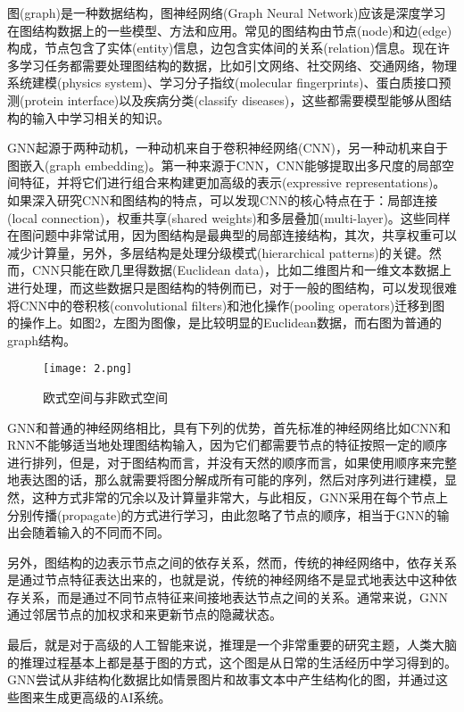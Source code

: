 \documentclass[a4paper,UTF8]{article}
\numberwithin{equation}{section}
\begin{document}
	图(graph)是一种数据结构，图神经网络(Graph Neural Network)应该是深度学习在图结构数据上的一些模型、方法和应用。常见的图结构由节点(node)和边(edge)构成，节点包含了实体(entity)信息，边包含实体间的关系(relation)信息。现在许多学习任务都需要处理图结构的数据，比如引文网络、社交网络、交通网络，物理系统建模(physics system)、学习分子指纹(molecular fingerprints)、蛋白质接口预测(protein interface)以及疾病分类(classify diseases)，这些都需要模型能够从图结构的输入中学习相关的知识。
	
	GNN起源于两种动机，一种动机来自于卷积神经网络(CNN)，另一种动机来自于图嵌入(graph embedding)。第一种来源于CNN，CNN能够提取出多尺度的局部空间特征，并将它们进行组合来构建更加高级的表示(expressive representations)。如果深入研究CNN和图结构的特点，可以发现CNN的核心特点在于：局部连接(local connection)，权重共享(shared weights)和多层叠加(multi-layer)。这些同样在图问题中非常试用，因为图结构是最典型的局部连接结构，其次，共享权重可以减少计算量，另外，多层结构是处理分级模式(hierarchical patterns)的关键。然而，CNN只能在欧几里得数据(Euclidean data)，比如二维图片和一维文本数据上进行处理，而这些数据只是图结构的特例而已，对于一般的图结构，可以发现很难将CNN中的卷积核(convolutional filters)和池化操作(pooling operators)迁移到图的操作上。如图2，左图为图像，是比较明显的Euclidean数据，而右图为普通的graph结构。
	
	\begin{figure}[ht]
		\centering
		\texttt{[image: 2.png]}
		\caption{欧式空间与非欧式空间}
		\label{fig:label}
	\end{figure}
	
	GNN和普通的神经网络相比，具有下列的优势，首先标准的神经网络比如CNN和RNN不能够适当地处理图结构输入，因为它们都需要节点的特征按照一定的顺序进行排列，但是，对于图结构而言，并没有天然的顺序而言，如果使用顺序来完整地表达图的话，那么就需要将图分解成所有可能的序列，然后对序列进行建模，显然，这种方式非常的冗余以及计算量非常大，与此相反，GNN采用在每个节点上分别传播(propagate)的方式进行学习，由此忽略了节点的顺序，相当于GNN的输出会随着输入的不同而不同。
	
	另外，图结构的边表示节点之间的依存关系，然而，传统的神经网络中，依存关系是通过节点特征表达出来的，也就是说，传统的神经网络不是显式地表达中这种依存关系，而是通过不同节点特征来间接地表达节点之间的关系。通常来说，GNN通过邻居节点的加权求和来更新节点的隐藏状态。
	
	最后，就是对于高级的人工智能来说，推理是一个非常重要的研究主题，人类大脑的推理过程基本上都是基于图的方式，这个图是从日常的生活经历中学习得到的。GNN尝试从非结构化数据比如情景图片和故事文本中产生结构化的图，并通过这些图来生成更高级的AI系统。
	
\end{document}
